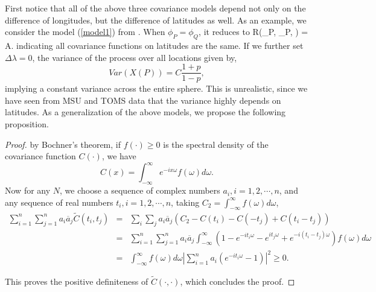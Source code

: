 First notice that all of the above three covariance models depend not only on the difference of longitudes, but the difference of latitudes as well. As an example, we consider the model (\ref{model1}) from \cite{Huang2012}. When $\phi_P = \phi_Q$, it reduces to
			\beq
			\nonumber
			R(\phi_P, \phi_P, \Delta \lambda) = A.
			\eeq
indicating all covariance functions on latitudes are the same. If we further set $\Delta \lambda = 0$, the variance of the process over all locations given by,
			\[
			Var(X(P)) = C\frac{1+p}{1 - p},
			\]
implying a constant variance across the entire sphere. This is unrealistic, since we have seen from MSU and TOMS data that the variance highly depends on latitudes. As a generalization of the above models, we propose the following proposition.
\begin{proof} by Bochner's theorem, if $f(\cdot) \ge 0$ is the spectral density of the covariance function $C(\cdot)$, we have
				\[
					C(x) = \int_{-\infty}^\infty e^{-ix\omega}f(\omega)d\omega.
				\]
Now for any $N$, we choose a sequence of complex numbers $a_i, i = 1, 2, \cdots, n$, and any sequence of real numbers $t_i, i = 1, 2, \cdots, n$, taking $C_2 = \int_{-\infty}^\infty f(\omega)d\omega$,
\begin{eqnarray*}
					\sum_{i=1}^n \sum_{j=1}^n a_i \overline{a}_j \tilde{C}(t_i, t_j) &=& \sum_i \sum_j a_i \overline{a}_j (C_2 - C(t_i) - C(-t_j) + C(t_i-t_j)) \\
					&=& \sum_{i=1}^n \sum_{j=1}^n a_i \overline{a}_j \int_{-\infty}^\infty(1-  e^{-it_i\omega} - e^{it_j\omega} + e^{-i(t_i-t_j)\omega})f(\omega)d\omega \\
					&=&\int_{-\infty}^\infty f(\omega)d\omega \left|\sum_{i=1}^n a_i(e^{-it_i\omega} - 1)\right|^2 \ge 0.
\end{eqnarray*}

This proves the positive definiteness of $\tilde{C}(\cdot, \cdot)$, which concludes the proof.

\end{proof}

